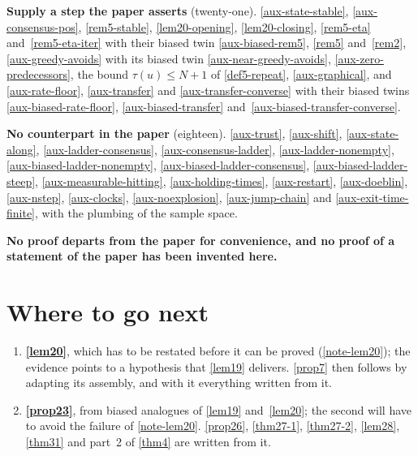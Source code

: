 \medskip \noindent\textbf{Supply a step the paper asserts} (twenty-one).
\ref{aux-state-stable}, \ref{aux-consensus-pos}, \ref{rem5-stable},
\ref{lem20-opening}, \ref{lem20-closing}, \ref{rem5-eta}
and~\ref{rem5-eta-iter} with their biased twin \ref{aux-biased-rem5},
\ref{rem5} and~\ref{rem2}, \ref{aux-greedy-avoids} with its biased twin
\ref{aux-near-greedy-avoids}, \ref{aux-zero-predecessors}, the bound $\tau(u) \le
N+1$ of \ref{def5-repeat}, \ref{aux-graphical}, and \ref{aux-rate-floor},
\ref{aux-transfer} and \ref{aux-transfer-converse} with their biased twins
\ref{aux-biased-rate-floor}, \ref{aux-biased-transfer}
and~\ref{aux-biased-transfer-converse}.

\medskip \noindent\textbf{No counterpart in the paper} (eighteen).
\ref{aux-trust}, \ref{aux-shift}, \ref{aux-state-along},
\ref{aux-ladder-consensus}, \ref{aux-consensus-ladder},
\ref{aux-ladder-nonempty}, \ref{aux-biased-ladder-nonempty},
\ref{aux-biased-ladder-consensus}, \ref{aux-biased-ladder-steep},
\ref{aux-measurable-hitting}, \ref{aux-holding-times}, \ref{aux-restart},
\ref{aux-doeblin}, \ref{aux-nstep}, \ref{aux-clocks},
\ref{aux-noexplosion}, \ref{aux-jump-chain} and \ref{aux-exit-time-finite},
with the plumbing of the sample space.

\medskip \noindent\textbf{No proof departs from the paper for convenience, and
no proof of a statement of the paper has been invented here.}

\section{Where to go next}

\begin{enumerate}
  \item \textbf{\ref{lem20}}, which has to be restated before it can be
    proved (\ref{note-lem20}); the evidence points to a hypothesis that
    \ref{lem19} delivers.  \ref{prop7} then follows by adapting its assembly,
    and with it everything written from it.
  \item \textbf{\ref{prop23}}, from biased analogues of \ref{lem19}
    and~\ref{lem20}; the second will have to avoid the failure of
    \ref{note-lem20}.  \ref{prop26}, \ref{thm27-1}, \ref{thm27-2},
    \ref{lem28}, \ref{thm31} and part~2 of \ref{thm4} are written from it.
\end{enumerate}
